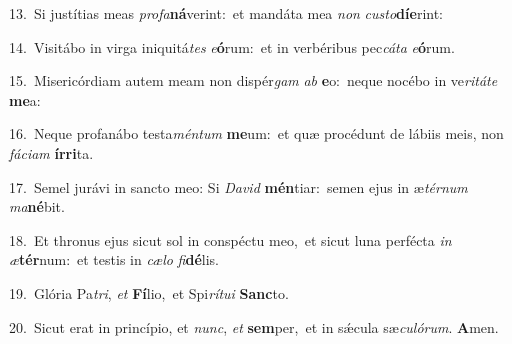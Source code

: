 {\numbfont\textcolor{\numbcolor}{13.}}~Si justítias meas \textit{pro}\-\textit{fa}\textbf{ná}verint:~\star et mandáta mea \textit{non} \textit{cus}\-\textit{to}\textbf{dí}\textbf{e}rint:\par
{\numbfont\textcolor{\numbcolor}{14.}}~Visitábo in virga iniquitá\textit{tes} \textit{e}\-\textbf{ó}rum:~\star et in verbéribus pec\-\textit{cá}\-\textit{ta} \textit{e}\-\textbf{ó}rum.\par
{\numbfont\textcolor{\numbcolor}{15.}}~Misericórdiam autem meam non dispér\textit{gam} \textit{ab} \textbf{e}\-o:~\star neque nocébo in ve\-\textit{ri}\-\textit{tá}\textit{te} \textbf{me}\-a:\par
{\numbfont\textcolor{\numbcolor}{16.}}~Neque profanábo testa\-\textit{mén}\-\textit{tum} \textbf{me}\-um:~\star et quæ procédunt de lábiis meis, non \textit{fá}\-\textit{ci}\textit{am} \textbf{ír}\-\textbf{ri}ta.\par
{\numbfont\textcolor{\numbcolor}{17.}}~Semel jurávi in sancto meo: Si \textit{Da}\-\textit{vid} \textbf{mén}\-tiar:~\star semen ejus in æ\-\textit{tér}\-\textit{num} \textit{ma}\-\textbf{né}bit.\par
{\numbfont\textcolor{\numbcolor}{18.}}~Et thronus ejus sicut sol in conspéctu meo,~\dagger et sicut luna perfécta \textit{in} \textit{æ}\-\textbf{tér}num:~\star et testis in \textit{cæ}\-\textit{lo} \textit{fi}\-\textbf{dé}lis.\par
{\numbfont\textcolor{\numbcolor}{19.}}~Glória Pa\-\textit{tri}\-, \textit{et} \textbf{Fí}\-lio,~\star et Spi\-\textit{rí}\-\textit{tu}\textit{i} \textbf{Sanc}\-to.\par
{\numbfont\textcolor{\numbcolor}{20.}}~Sicut erat in princípio, et \textit{nunc}\-, \textit{et} \textbf{sem}\-per,~\star et in sǽcula sæ\-\textit{cu}\-\textit{ló}\textit{rum}. \textbf{A}\-men.\par
